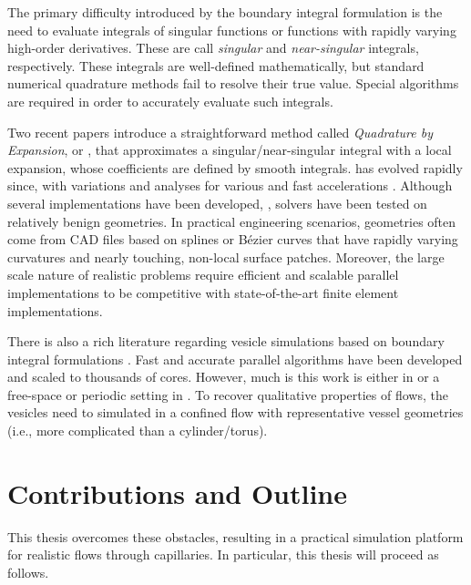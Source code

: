 The primary difficulty introduced by the boundary integral formulation is the need to evaluate integrals of singular functions or functions with rapidly varying high-order derivatives. These are call \textit{singular} and \textit{near-singular} integrals, respectively.
These integrals are well-defined mathematically, but standard numerical quadrature methods fail to resolve their true value.
Special algorithms are required in order to accurately evaluate such integrals.

Two recent papers \cite{barnett2014evaluation,KBGO} introduce a straightforward method called \textit{Quadrature by Expansion}, or \qbx, that approximates a singular/near-singular integral with a local expansion, whose coefficients are defined by smooth integrals.
\qbx has evolved rapidly since, with variations \cite{ST,aT1,RBZ,af2016fast} and analyses \cite{EGK,aT2,klinteberg2020quadrature} for various \pdes and fast accelerations \cite{RKO,wala20193d,wala2019optimization,wala2020approximation}.
Although several \threed implementations have been developed, \cite{ST, wala2019optimization,wala2020approximation, wala20193d}, \threed solvers have been tested on relatively benign geometries.
In practical engineering scenarios, geometries often come from CAD files based on splines or B\'ezier curves that have rapidly varying curvatures and nearly touching, non-local surface patches.
Moreover, the large scale nature of realistic problems require efficient and scalable parallel implementations to be competitive with state-of-the-art finite element implementations.

There is also a rich literature regarding vesicle simulations based on boundary integral formulations \cite{Veerapaneni2009,Veerapaneni2009b,Veerapaneni2011,ghigliotti2011,lu2017,rahimian2010petascale,rahimian2015,lu2018parallel,Malhotra2017,sorgentone2018highly,sorgentone20193d}.
Fast and accurate parallel algorithms have been developed and scaled to thousands of cores. 
However, much is this work is either in \twod \cite{Veerapaneni2009,Veerapaneni2009b,Veerapaneni2011,lu2017} or a free-space or periodic setting in \threed \cite{rahimian2010petascale,rahimian2015,lu2018parallel,Malhotra2017,sorgentone2018highly,sorgentone20193d}.
To recover qualitative properties of \rbc flows, the vesicles need to simulated in a confined flow with representative vessel geometries (i.e., more complicated than a cylinder/torus).

\section{Contributions and Outline}
This thesis overcomes these obstacles, resulting in a practical simulation platform for realistic \rbc flows through capillaries.
In particular, this thesis will proceed as follows.

